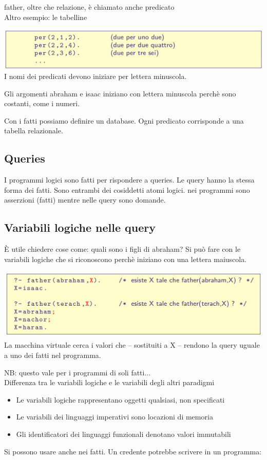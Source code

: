 \documentclass[10pt]{article}
\begin{document}
father, oltre che relazione, è chiamato anche predicato
\\
Altro esempio: le tabelline

\includegraphics[scale=0.2]{Immagini/prolog3.png}
\\
I nomi dei predicati devono iniziare per lettera minuscola.

Gli argomenti abraham e isaac iniziano con lettera minuscola
perchè sono costanti, come i numeri.

Con i fatti possiamo definire un database. Ogni predicato corrisponde a una tabella relazionale.
\subsection{Queries}
I programmi logici sono fatti per rispondere a queries.
Le query hanno la stessa forma dei fatti. Sono entrambi dei
cosiddetti atomi logici. nei programmi sono asserzioni (fatti) mentre
nelle query sono domande.
\subsection{Variabili logiche nelle query}
È utile chiedere cose come: quali sono i figli di abraham? 
Si può fare con le variabili logiche 
che si riconoscono perchè iniziano con una lettera maiuscola.

\includegraphics[scale=0.2]{Immagini/prolog4.png}
\\
La macchina virtuale cerca i valori che – sostituiti a X – rendono
la query uguale a uno dei fatti nel programma. 

NB: questo vale per i programmi di soli fatti...
\\
Differenza tra le variabili logiche e le variabili degli altri paradigmi
\begin{itemize}
    \item Le variabili logiche rappresentano oggetti qualsiasi, non specificati
    \item Le variabili dei linguaggi imperativi sono locazioni di memoria
    \item Gli identificatori dei linguaggi funzionali denotano valori immutabili
\end{itemize}
Si possono usare anche nei fatti. Un credente potrebbe scrivere
in un programma:
\end{document}
